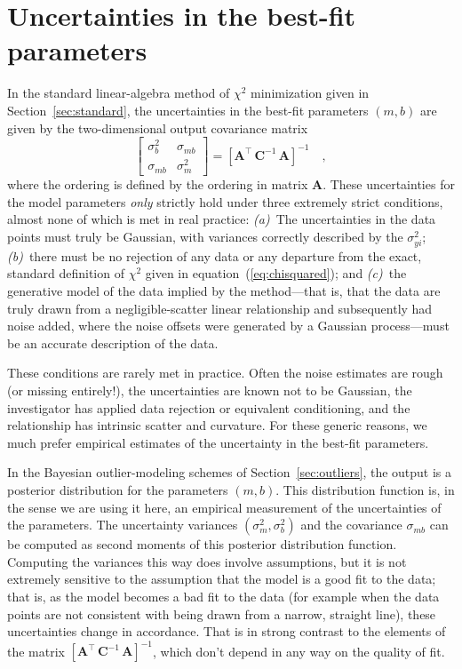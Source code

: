 \documentclass[12pt,twoside]{article}
\newcommand{\sectionname}{Section}
\newcommand{\equationname}{equation}
\newcommand{\mmatrix}[1]{\boldsymbol{#1}}
\newcommand{\inverse}[1]{{#1}^{-1}}
\newcommand{\transpose}[1]{{#1}^{\scriptscriptstyle \top}}
\newcommand{\mA}{\mmatrix{A}}
\newcommand{\mAT}{\transpose{\mA}}
\newcommand{\mC}{\mmatrix{C}}
\newcommand{\mCinv}{\inverse{\mC}}
\begin{document}
\section{Uncertainties in the best-fit parameters}\label{sec:uncertainty}

In the standard linear-algebra method of $\chi^2$ minimization given
in \sectionname~\ref{sec:standard}, the uncertainties in the best-fit
parameters $(m,b)$ are given by the two-dimensional output covariance
matrix
\begin{equation}
\left[\begin{array}{cc}
\sigma_{b}^2 & \sigma_{mb} \\
\sigma_{mb} & \sigma_{m}^2
\end{array}\right] = \inverse{\left[\mAT\,\mCinv\,\mA\right]} \quad ,
\end{equation}
where the ordering is defined by the ordering in matrix $\mA$.  These
uncertainties for the model parameters \emph{only} strictly hold under
three extremely strict conditions, almost none of which is met in real
practice: \textsl{(a)}~The uncertainties in the data points must truly
be Gaussian, with variances correctly described by the
$\sigma_{yi}^2$; \textsl{(b)}~there must be no rejection of any data
or any departure from the exact, standard definition of $\chi^2$ given
in \equationname~(\ref{eq:chisquared}); and \textsl{(c)}~the
generative model of the data implied by the method---that is, that the
data are truly drawn from a negligible-scatter linear relationship and
subsequently had noise added, where the noise offsets were generated
by a Gaussian process---must be an accurate description of the data.

These conditions are rarely met in practice.  Often the noise
estimates are rough (or missing entirely!), the uncertainties are
known not to be Gaussian, the investigator has applied data rejection
or equivalent conditioning, and the relationship has intrinsic scatter
and curvature.  For these generic reasons, we much prefer empirical
estimates of the uncertainty in the best-fit parameters.

In the Bayesian outlier-modeling schemes of
\sectionname~\ref{sec:outliers}, the output is a posterior
distribution for the parameters $(m,b)$.  This distribution function
is, in the sense we are using it here, an empirical measurement of the
uncertainties of the parameters.  The uncertainty variances
$(\sigma_m^2,\sigma_b^2)$ and the covariance $\sigma_{mb}$ can be
computed as second moments of this posterior distribution function.
Computing the variances this way does involve assumptions, but it is
not extremely sensitive to the assumption that the model is a good fit
to the data; that is, as the model becomes a bad fit to the data (for
example when the data points are not consistent with being drawn from
a narrow, straight line), these uncertainties change in accordance.
That is in strong contrast to the elements of the matrix
$\inverse{\left[\mAT\,\mCinv\,\mA\right]}$, which don't depend in any
way on the quality of fit.
\end{document}
